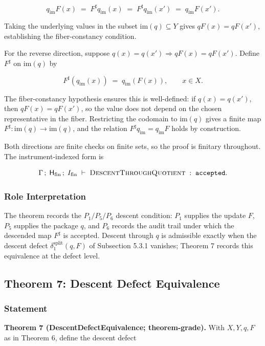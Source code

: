 \documentclass[11pt]{article}
\theoremstyle{definition}
\begin{document}
\[
q_{\mathrm{im}}F(x)\;=\;F^\sharp q_{\mathrm{im}}(x)\;=\;F^\sharp q_{\mathrm{im}}(x')\;=\;q_{\mathrm{im}}F(x').
\]

Taking the underlying values in the subset \(\mathrm{im}(q)\subseteq Y\) gives \(qF(x)=qF(x')\), establishing the fiber-constancy condition.

For the reverse direction, suppose \(q(x)=q(x')\Rightarrow qF(x)=qF(x')\). Define \(F^\sharp\) on \(\mathrm{im}(q)\) by

\[
F^\sharp(q_{\mathrm{im}}(x))\;=\;q_{\mathrm{im}}(F(x)),\qquad x\in X.
\]

The fiber-constancy hypothesis ensures this is well-defined: if \(q(x)=q(x')\), then \(qF(x)=qF(x')\), so the value does not depend on the chosen representative in the fiber. Restricting the codomain to \(\mathrm{im}(q)\) gives a finite map \(F^\sharp:\mathrm{im}(q)\to\mathrm{im}(q)\), and the relation \(F^\sharp q_{\mathrm{im}}=q_{\mathrm{im}}F\) holds by construction.

Both directions are finite checks on finite sets, so the proof is finitary throughout. The instrument-indexed form is

\[
\Gamma\,;\;\mathsf H_{\mathrm{fin}}\,;\;I_{\mathrm{fin}}\;\vdash\;\textsc{DescentThroughQuotient}\;:\;\texttt{accepted}.
\]

\subsubsection{Role Interpretation}

The theorem records the \(P_1/P_5/P_6\) descent condition: \(P_1\) supplies the update \(F\), \(P_5\) supplies the package \(q\), and \(P_6\) records the audit trail under which the descended map \(F^\sharp\) is accepted. Descent through \(q\) is admissible exactly when the descent defect \(\delta_1^{\mathrm{split}}(q,F)\) of Subsection 5.3.1 vanishes; Theorem 7 records this equivalence at the defect level.

\subsection{Theorem 7: Descent Defect Equivalence}

\subsubsection{Statement}

\textbf{Theorem 7 (DescentDefectEquivalence; theorem-grade).} With \(X,Y,q,F\) as in Theorem 6, define the descent defect
\end{document}

